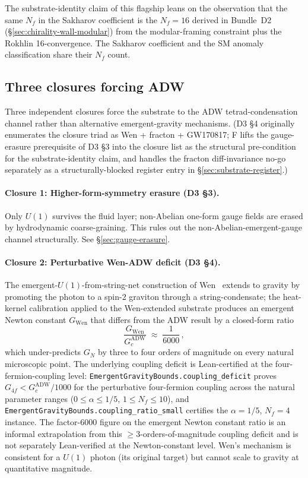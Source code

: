 \documentclass[aps,prd,reprint,nofootinbib,superscriptaddress]{revtex4-2}
\begin{document}
The substrate-identity claim of this flagship leans on the
observation that the same $N_f$ in the Sakharov coefficient is the
$N_f = 16$ derived in Bundle~D2 (\S\ref{sec:chirality-wall-modular})
from the modular-framing constraint plus the Rokhlin 16-convergence.
The Sakharov coefficient and the SM anomaly classification share
their $N_f$ count.

\subsection{Three closures forcing ADW}

Three independent closures force the substrate to the ADW
tetrad-condensation channel rather than alternative emergent-gravity
mechanisms. (D3 \S 4 originally enumerates the closure triad as
Wen + fracton + GW170817; F lifts the gauge-erasure prerequisite
of D3 \S 3 into the closure list as the structural pre-condition for
the substrate-identity claim, and handles the fracton diff-invariance
no-go separately as a structurally-blocked register entry in
\S\ref{sec:substrate-register}.)

\paragraph{Closure 1: Higher-form-symmetry erasure (D3 \S 3).} Only
$U(1)$ survives the fluid layer; non-Abelian one-form gauge fields
are erased by hydrodynamic coarse-graining. This rules out the
non-Abelian-emergent-gauge channel structurally. See
\S\ref{sec:gauge-erasure}.

\paragraph{Closure 2: Perturbative Wen-ADW deficit (D3 \S 4).} The
emergent-$U(1)$-from-string-net construction of Wen~\cite{Wen2003}
extends to gravity by promoting the photon to a spin-2 graviton
through a string-condensate; the heat-kernel calibration applied to
the Wen-extended substrate produces an emergent Newton constant
$G_{\mathrm{Wen}}$ that differs from the ADW result by a closed-form
ratio
\begin{equation}
  \frac{G_{\mathrm{Wen}}}{G_c^{\mathrm{ADW}}} \;\approx\; \frac{1}{6000}\,,
\end{equation}
\noindent
which under-predicts $G_N$ by three to four orders of magnitude on
every natural microscopic point. The underlying coupling deficit is
Lean-certified at the four-fermion-coupling level:
\texttt{EmergentGravityBounds.coupling\_deficit} proves $G_{4f} <
G_c^{\mathrm{ADW}} / 1000$ for the perturbative four-fermion coupling
across the natural parameter ranges
($0 \le \alpha \le 1/5$, $1 \le N_f \le 10$), and
\texttt{EmergentGravityBounds.coupling\_ratio\_small} certifies the
$\alpha = 1/5$, $N_f = 4$ instance. The factor-6000 figure on the
emergent Newton constant ratio is an informal extrapolation from
this $\geq 3$-orders-of-magnitude coupling deficit and is not
separately Lean-verified at the Newton-constant level. Wen's
mechanism is consistent for a $U(1)$ photon (its original
target) but cannot scale to gravity at quantitative magnitude.
\end{document}
